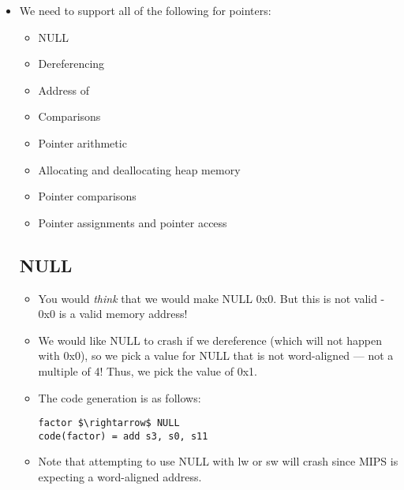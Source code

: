 \documentclass[12pt]{article}
\begin{document}
\begin{itemize}
    \item We need to support all of the following for pointers:
        \begin{itemize}
            \item NULL
            \item Dereferencing
            \item Address of
            \item Comparisons
            \item Pointer arithmetic
            \item Allocating and deallocating heap memory
            \item Pointer comparisons
            \item Pointer assignments and pointer access
        \end{itemize}

        \subsection{NULL}
        \begin{itemize}
            \item You would \emph{think} that we would make NULL 0x0.  But this is not valid - 0x0 is a valid memory address!
            \item We would like NULL to crash if we dereference (which will not happen with 0x0), so we pick a value for NULL that is not word-aligned --- not a multiple of 4!  Thus, we pick the value of 0x1.
            \item The code generation is as follows:
\begin{lstlisting}[mathescape, numbers=none, breaklines=true]
factor $\rightarrow$ NULL
code(factor) = add s3, s0, s11
\end{lstlisting}
            \item Note that attempting to use NULL with lw or sw will crash since MIPS is expecting a word-aligned address.
        \end{itemize}


\end{itemize}
\end{document}
